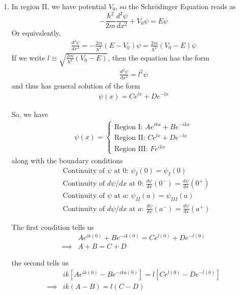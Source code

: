 \documentclass{article}
\begin{document}
\vskip 0.25cm
\begin{enumerate}[label=(\alph*)]
  \item In region II, we have potential $V_0$, so the Schrödinger Equation reads as
  \[ -\frac{\hbar^2}{2m} \frac{d^2 \psi}{dx^2} + V_0 \psi = E \psi \] 
  Or equivalently,
  \begin{align*}
    \frac{d^2 \psi}{dx^2} = -\frac{2m}{\hbar^2}(E-V_0)\psi = \frac{2m}{\hbar^2}(V_0 - E)\psi
  \end{align*}
  If we write $l \equiv \sqrt{\frac{2m}{\hbar^2}(V_0 - E)}$, then the equation has the form
  \begin{align*}
    \frac{d^2 \psi}{dx^2} = l^2 \psi
  \end{align*}
  and thus has general solution of the form 
  \begin{align*}
    \boxed{\psi(x) = Ce^{lx} + De^{-lx}}
  \end{align*}
  
  So, we have 
  \begin{align*}
    \psi(x) = \begin{cases}
      \text{Region I: } Ae^{ikx} + Be^{-ikx} \\
      \text{Region II: } Ce^{lx} + De^{-lx}\\
      \text{Region III: } Fe^{ikx}
    \end{cases}
  \end{align*}
  along with the boundary conditions
  \begin{align*}
    &\text{Continuity of $\psi$ at $0$: }\psi_I(0) = \psi_I(0) \\
    &\text{Continuity of $d\psi/dx$ at $0$: } \frac{d\psi}{dx}(0^{-}) = \frac{d\psi}{dx}(0^{+}) \\
    &\text{Continuity of $\psi$ at $a$: } \psi_{II}(a) = \psi_{III}(a) \\
    &\text{Continuity of $d\psi/dx$ at $a$: } \frac{d\psi}{dx}(a^{-}) = \frac{d\psi}{dx}(a^{+}) 
  \end{align*}

  The first condition tells us 
  \begin{align*}
    &Ae^{ik(0)} + Be^{-ik(0)} = Ce^{l(0)} + De^{-l(0)} \\
    \implies&A + B = C+ D 
  \end{align*}

  the second tells us 
  \begin{align*}
    &ik\left[Ae^{ik(0)} - Be^{-ika(0)}\right] = l\left[  Ce^{l(0)} - De^{-l(0)}\right] \\ 
    \implies& ik(A - B) = l(C - D)
  \end{align*}


\end{enumerate}
\end{document}
